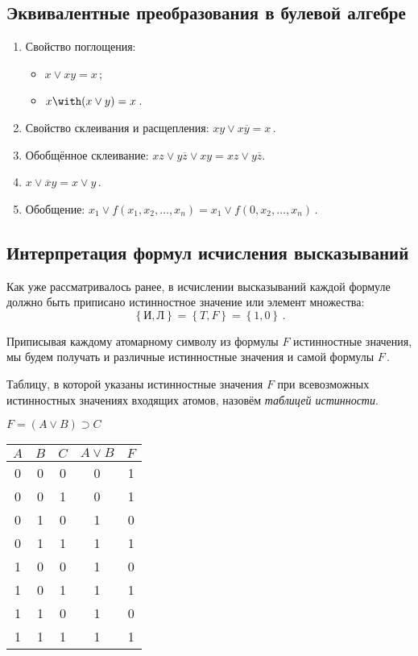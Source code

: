\subsection{Эквивалентные преобразования в булевой алгебре}
\begin{enumerate}
\item Свойство поглощения:
  \begin{itemize}
  \item $x \lor xy = x$\,;
  \item $x \with (x \lor y) = x$\,.
  \end{itemize}
\item Свойство склеивания и расщепления: $xy \lor x\overline{y} = x$\,.
\item Обобщённое склеивание: $xz \lor y\overline{z} \lor xy = xz \lor
y\overline{z}$.
\item $x \lor \overline{x}y = x \lor y$\,.
\item Обобщение: $x_1 \lor f(x_1,x_2,\ldots,x_n) = x_1 \lor
f(0,x_2,\ldots,x_n)$\,.
\end{enumerate}

\subsection{Интерпретация формул исчисления высказываний}

Как уже рассматривалось ранее, в исчислении высказываний каждой
формуле должно быть приписано истинностное значение или элемент
множества:
$$ \left\{ И,Л \right\} = \left\{ T,F \right\} = \left\{ 1,0 \right\}
\,.$$

Приписывая каждому атомарному символу из формулы $F$ истинностные
значения, мы будем получать и различные истинностные значения и самой
формулы $F$\,.

Таблицу, в которой указаны истинностные значения $F$ при всевозможных
истинностных значениях входящих атомов, назовём \emph{таблицей
истинности}.

\begin{ex} $F = (A \lor B) \supset C$
  \begin{center}
    \begin{tabular}{c|c|c||c|c|} $A$ & $B$ & $C$ & $A \lor B$ & $F$\\
\hline\hline 0 & 0 & 0 & 0 & 1\\ \hline 0 & 0 & 1 & 0 & 1\\ \hline 0 &
1 & 0 & 1 & 0\\ \hline 0 & 1 & 1 & 1 & 1\\ \hline 1 & 0 & 0 & 1 & 0\\
\hline 1 & 0 & 1 & 1 & 1\\ \hline 1 & 1 & 0 & 1 & 0\\ \hline 1 & 1 & 1
& 1 & 1\\ \hline
    \end{tabular}
  \end{center}
\end{ex}

